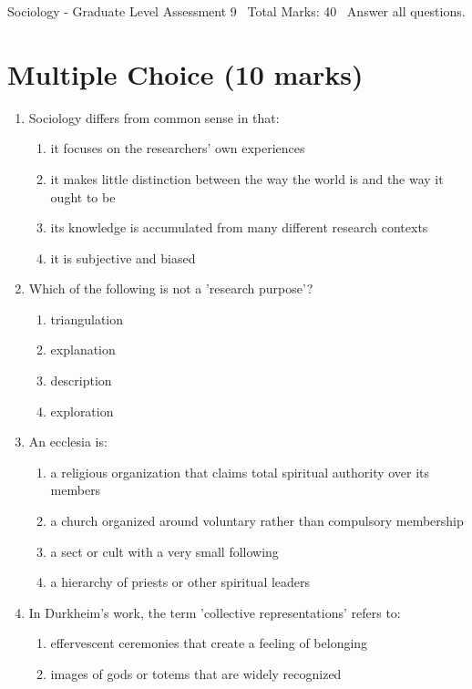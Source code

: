 \documentclass[12pt]{article}
\begin{document}
\begin{center}
Sociology - Graduate Level Assessment 9 \
Total Marks: 40 \
Answer all questions.
\end{center}

\section*{Multiple Choice (10 marks)}
\begin{enumerate}[label=\arabic*.]
\item Sociology differs from common sense in that:
\begin{enumerate}[label=(\alph*)]
    \item it focuses on the researchers' own experiences
    \item it makes little distinction between the way the world is and the way it ought to be
    \item its knowledge is accumulated from many different research contexts
    \item it is subjective and biased
\end{enumerate}
\item Which of the following is not a 'research purpose'?
\begin{enumerate}[label=(\alph*)]
    \item triangulation
    \item explanation
    \item description
    \item exploration
\end{enumerate}
\item An ecclesia is:
\begin{enumerate}[label=(\alph*)]
    \item a religious organization that claims total spiritual authority over its members
    \item a church organized around voluntary rather than compulsory membership
    \item a sect or cult with a very small following
    \item a hierarchy of priests or other spiritual leaders
\end{enumerate}
\item In Durkheim's work, the term 'collective representations' refers to:
\begin{enumerate}[label=(\alph*)]
    \item effervescent ceremonies that create a feeling of belonging
    \item images of gods or totems that are widely recognized

\end{enumerate}
\end{enumerate}
\end{document}

